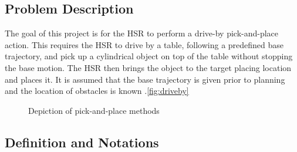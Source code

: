 \documentclass[11pt]{article}
\begin{document}
    \subsection{Problem Description}
        The goal of this project is for the HSR to perform a drive-by pick-and-place action. This requires the HSR to drive by a table, following a predefined base trajectory, and pick up a cylindrical object on top of the table without stopping the base motion. The HSR then brings the object to the target placing location and places it. It is assumed that the base trajectory is given prior to planning and the location of obstacles is known .\cref{fig:driveby}
        \begin{figure}[ht]
            \centering
            \quad
            \caption{Depiction of pick-and-place methods}
            \label{fig:driveby_methods}
        \end{figure}

    
    \subsection{Definition and Notations}

\end{document}
